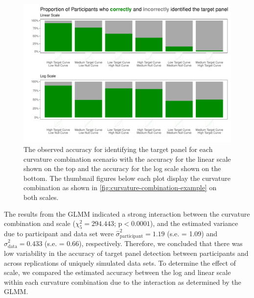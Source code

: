 \documentclass[12pt]{article}
\begin{document}
\begin{figure}[tbp]

{\centering \includegraphics[width=\linewidth,]{logarithmic-lineups-revisions_files/figure-latex/obs-accuracy-1} 

}

\caption{The observed accuracy for identifying the target panel for each curvature combination scenario with the accuracy for the linear scale shown on the top and the accuracy for the log scale shown on the bottom. The thumbnail figures below each plot display the curvature combination as shown in \cref{fig:curvature-combination-example} on both scales.}\label{fig:obs-accuracy}
\end{figure}

The results from the GLMM indicated a strong interaction between the
curvature combination and scale (\(\chi^2_5 = 294.443\);
\(\text{p} <0.0001\)), and the estimated variance due to participant and
data set were \(\hat\sigma^2_{\text{participant}} = 1.19\) (s.e. = 1.09)
and \(\hat\sigma^2_{\text{data}} = 0.433\) (s.e. = 0.66), respectively.
Therefore, we concluded that there was low variability in the accuracy
of target panel detection between participants and across replications
of uniquely simulated data sets. To determine the effect of scale, we
compared the estimated accuracy between the log and linear scale within
each curvature combination due to the interaction as determined by the
GLMM.
\end{document}
